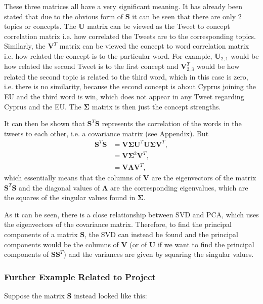 \documentclass[11pt,a4paper]{article}
\begin{document}
These three matrices all have a very significant meaning. It has already been stated that due to the obvious form of $\mathbf{S}$ it can be seen that there are only 2 topics or concepts. The $\mathbf{U}$ matrix can be viewed as the Tweet to concept correlation matrix i.e. how correlated the Tweets are to the corresponding topics. Similarly, the $\mathbf{V}^T$ matrix can be viewed  the concept to word correlation matrix i.e. how related the concept is to the particular word. For example, $\mathbf{U}_{2,1}$ would be how related the second Tweet is to the first concept and $\mathbf{V}^T_{2,3}$ would be how related the second topic is related to the third word, which in this case is zero, i.e. there is no similarity, because the second concept is about Cyprus joining the EU and the third word is win, which does not appear in any Tweet regarding Cyprus and the EU. The $\mathbf{\Sigma}$ matrix is then just the concept strengths.

It can then be shown that $\mathbf{S}^T\mathbf{S}$ represents the correlation of the words in the tweets to each other, i.e. a covariance matrix (see Appendix). But 
\begin{align*}
\mathbf{S}^T\mathbf{S} &= \mathbf{V}\mathbf{\Sigma}\mathbf{U}^T \mathbf{U}\mathbf{\Sigma}\mathbf{V}^T,\\
& = \mathbf{V}\mathbf{\Sigma}^2\mathbf{V}^T,\\
& = \mathbf{V}\mathbf{\Lambda}\mathbf{V}^T,
\end{align*}
which essentially means that the columns of $\mathbf{V}$ are the eigenvectors of the matrix $\mathbf{S}^T\mathbf{S}$ and the diagonal values of $\mathbf{\Lambda}$ are the corresponding eigenvalues, which are the squares of the singular values found in $\mathbf{\Sigma}$.

As it can be seen, there is a close relationship between SVD and PCA, which uses the eigenvectors of the covariance matrix. Therefore, to find the principal components of a matrix $\mathbf{S}$, the SVD can instead be found and the principal components would be the columns of $\mathbf{V}$ (or of $\mathbf{U}$ if we want to find the principal components of $\mathbf{S}\mathbf{S}^T$) and the variances are given by squaring the singular values.

\subsubsection{Further Example Related to Project}
Suppose the matrix $\mathbf{S}$ instead looked like this:
\end{document}
